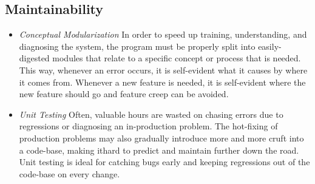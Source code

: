 \documentclass[titlepage, 12pt]{extarticle}
\begin{document}
\subsection{Maintainability}
\begin{itemize}
\item {\it Conceptual Modularization} In order to speed up training, understanding, and diagnosing the system, the program must be properly split into easily-digested modules that relate to a specific concept or process that is needed. This way, whenever an error occurs, it is self-evident what it causes by where it comes from. Whenever a new feature is needed, it is self-evident where the new feature should go and feature creep can be avoided.
\item {\it Unit Testing} Often, valuable hours are wasted on chasing errors due to regressions or diagnosing an in-production problem. The hot-fixing of production problems may also gradually introduce more and more cruft into a code-base, making ithard to predict and maintain further down the road. Unit testing is ideal for catching bugs early and keeping regressions out of the code-base on every change.
\end{itemize}
\end{document}
